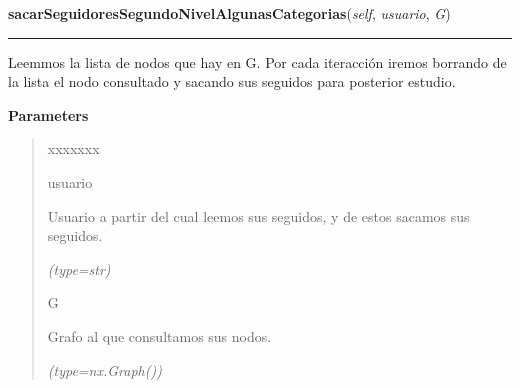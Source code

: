 \hspace{.8\funcindent}\begin{boxedminipage}{\funcwidth}

    \raggedright \textbf{sacarSeguidoresSegundoNivelAlgunasCategorias}(\textit{self}, \textit{usuario}, \textit{G})

    \vspace{-1.5ex}

    \rule{\textwidth}{0.5\fboxrule}
\setlength{\parskip}{2ex}
    Leemmos la lista de nodos que hay en G. Por cada iteracción iremos 
    borrando de la lista el nodo consultado y sacando sus seguidos para 
    posterior estudio.

\setlength{\parskip}{1ex}
      \textbf{Parameters}
      \vspace{-1ex}

      \begin{quote}
        \begin{Ventry}{xxxxxxx}

          \item[usuario]

          Usuario a partir del cual leemos sus seguidos, y de estos sacamos
          sus seguidos.

            {\it (type=str)}

          \item[G]

          Grafo al que consultamos sus nodos.

            {\it (type=nx.Graph())}

        \end{Ventry}

      \end{quote}

    \end{boxedminipage}

    \label{grafico:Grafico:colorearNodos}

    \vspace{0.5ex}


